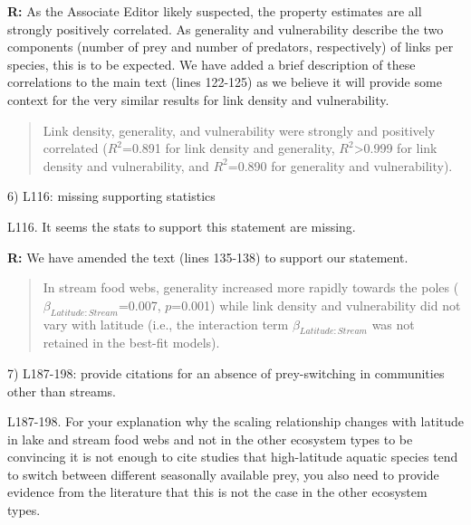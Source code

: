 \documentclass[12pt]{letter}
\newenvironment{refquote}{\bigskip \begin{it}}{\end{it}\smallskip}
\begin{document}
  \textbf{R:} As the Associate Editor likely suspected, the 
  property estimates are all strongly positively correlated. 
  As generality and vulnerability describe the two 
  components (number of prey and number of predators,
  respectively) of links per species, this is to be 
  expected. We have added a brief description of these 
  correlations to the main text (lines 122-125) as we 
  believe it will provide some context for the very similar 
  results for link density and vulnerability.

  \begin{quotation}

    Link density, generality, and vulnerability were strongly and positively
    correlated ($R^2$=0.891 for link density and generality,
    $R^2$\textgreater0.999 for link density and vulnerability, and $R^2$=0.890
    for generality and vulnerability).

  \end{quotation}


  6) L116: missing supporting statistics

  \begin{refquote}

    L116. It seems the stats to support this statement are missing.

  \end{refquote}
 

  \textbf{R:} We have amended the text (lines 135-138) to support our statement.

  \begin{quotation}
    In stream food
    webs, generality increased more rapidly towards the poles
    ($\beta_{Latitude:Stream}$=0.007, $p$=0.001) while link density and
    vulnerability did not vary with latitude (i.e., the interaction term $\beta_{Latitude:Stream}$ was not retained in the best-fit models).
  \end{quotation}


  7) L187-198: provide citations for an absence of prey-switching in communities other than streams.

  \begin{refquote}

    L187-198. For your explanation why the scaling relationship changes with
    latitude in lake and stream food webs and not in the other ecosystem types
    to be convincing it is not enough to cite studies that high-latitude
    aquatic species tend to switch between different seasonally available
    prey, you also need to provide evidence from the literature that this is
    not the case in the other ecosystem types.

  \end{refquote}
\end{document}
